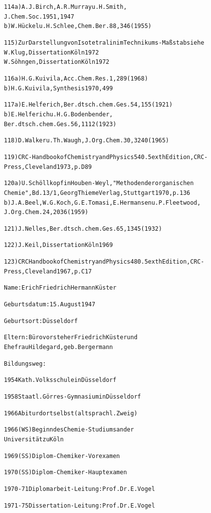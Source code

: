 \documentclass[a4paper,11pt]{article}
\begin{document}
\begin{alltt}
114 a) A.J.Birch, A.R.Murray u. H.Smith,
       J.Chem.Soc. 1951, 1947
    b) W.Hückel u. H.Schlee, Chem.Ber. 88, 346 (1955)

115)   Zur Darstellung von Isotetralin im Technikums-Maßstab siehe
       W.Klug, Dissertation Köln 1972
       W.Söhngen, Dissertation Köln 1972

116 a) H.G.Kuivila, Acc.Chem.Res. 1, 289 (1968)
    b) H.G.Kuivila, Synthesis 1970, 499

117 a) E.Helferich, Ber.dtsch.chem.Ges. 54, 155 (1921)
    b) E.Helferich u. H.G.Bodenbender,
       Ber.dtsch.chem.Ges. 56, 1112 (1923)

118)   D.Walker u. Th.Waugh, J.Org.Chem. 30, 3240 (1965)

119)   CRC-Handbook of Chemistry and Physics 54\raise0.5ex\hbox{th} Edition, CRC-
       Press, Cleveland 1973, p. D 89

120 a) U.Schöllkopf in Houben-Weyl, "Methoden der organischen
       Chemie", Bd. 13/1, Georg Thieme Verlag, Stuttgart 1970, p. 136
    b) J.A.Beel, W.G.Koch, G.E.Tomasi, E.Hermansen u. P.Fleetwood,
       J.Org.Chem. 24, 2036 (1959)

121)   J.Nelles, Ber.dtsch.chem.Ges. 65, 1345 (1932)

122)   J.Keil, Dissertation Köln 1969

123)   CRC Handbook of Chemistry and Physics 48\raise0.5ex\hbox{th} Edition, CRC-
       Press, Cleveland 1967, p. C 17
\newpage




Name:           Erich Friedrich Hermann Küster
          
Geburtsdatum:   15. August 1947

Geburtsort:     Düsseldorf

Eltern:         Bürovorsteher Friedrich Küster und
                Ehefrau Hildegard, geb. Bergermann


Bildungsweg:


1954            Kath. Volksschule in Düsseldorf

1958            Staatl. Görres-Gymnasium in Düsseldorf

1966            Abitur dortselbst (altsprachl. Zweig)

1966 (WS)       Beginn des Chemie-Studiums an der
                Universität zu Köln

1969 (SS)       Diplom-Chemiker-Vorexamen

1970 (SS)       Diplom-Chemiker-Hauptexamen

1970 - 71       Diplomarbeit - Leitung: Prof. Dr. E. Vogel

1971 - 75       Dissertation - Leitung: Prof. Dr. E. Vogel
\end{alltt}
\end{document}
